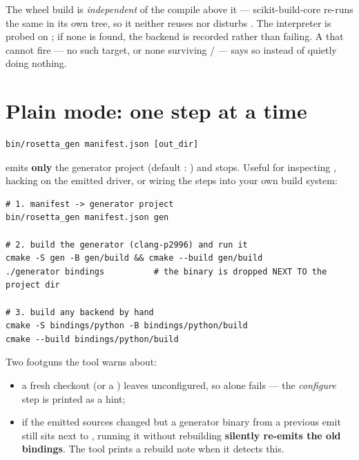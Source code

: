 \begin{note}
The wheel build is \emph{independent} of the compile above it ---
scikit-build-core re-runs the same  in its own tree, so it
neither reuses nor disturbs . The interpreter is probed on
; if none is found, the backend is recorded
 rather than failing. A
 that cannot fire --- no such target, or none surviving
/ --- says so instead of quietly doing nothing.
\end{note}

\section{Plain mode: one step at a time}

\begin{lstlisting}[style=sh]
bin/rosetta_gen manifest.json [out_dir]
\end{lstlisting}

emits \textbf{only} the generator project (default :
) and stops. Useful for inspecting
, hacking on the emitted driver, or wiring the steps into your
own build system:

\begin{lstlisting}[style=sh]
# 1. manifest -> generator project
bin/rosetta_gen manifest.json gen

# 2. build the generator (clang-p2996) and run it
cmake -S gen -B gen/build && cmake --build gen/build
./generator bindings          # the binary is dropped NEXT TO the project dir

# 3. build any backend by hand
cmake -S bindings/python -B bindings/python/build
cmake --build bindings/python/build
\end{lstlisting}

Two footguns the tool warns about:

\begin{itemize}
  \item a fresh checkout (or a ) leaves 
    unconfigured, so  alone fails --- the \emph{configure}
    step is printed as a  hint;
  \item if the emitted sources changed but a generator binary from a previous
    emit still sits next to , running it without rebuilding
    \textbf{silently re-emits the old bindings}. The tool prints a rebuild note
    when it detects this.
\end{itemize}

